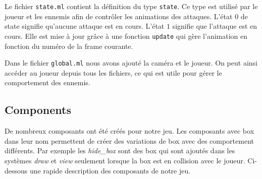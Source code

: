 \documentclass{article}
\begin{document}
Le fichier \verb|state.ml| contient la définition du type \texttt{state}. Ce type est utilisé par le joueur et les ennemis 
afin de contrôler les animations des attaques. L'état $0$ de state signifie qu'aucune attaque est en cours. L'état $1$ 
signifie que l'attaque est en cours. Elle est mise à jour grâce à une fonction \verb|update| qui gère l'animation en 
fonction du numéro de la frame courante.

Dans le fichier \verb|global.ml| nous avons ajouté la caméra et le joueur. On peut ainsi accéder au joueur depuis tous les 
fichiers, ce qui est utile pour gérer le comportement des ennemis.

\subsection{Components}
De nombreux composants ont été créés pour notre jeu. Les composants avec box dans leur nom permettent de créer des 
variations de box avec des comportement différents. Par exemple les \textit{hide\_box} sont des box qui sont 
ajoutés dans les systèmes \textit{draw} et \textit{view} seulement lorsque la box est en collision avec le joueur.
Ci-dessous une rapide description des composants de notre jeu.
\end{document}
